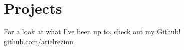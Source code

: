 \documentclass[]{hieudo-build}
\begin{document}
\begin{minipage}[t]{0.65\textwidth}


\section{Projects}
\descript{}
For a look at what I've been up to, check out my Github! \\
\faGithub \hspace{3 pt} \href{https://github.com/arielrezinn}{github.com/arielrezinn}\\




\end{minipage} 
\end{document}
